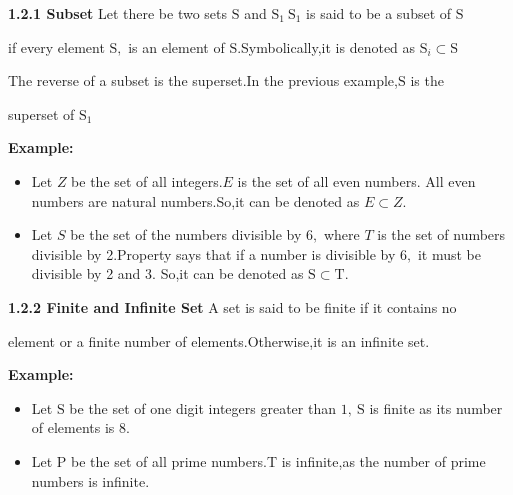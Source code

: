 \documentclass [10pt,a4paper]{book}
\begin{document}
\textbf{1.2.1 Subset}
Let there be two sets $\mathrm{S}$ and $\mathrm{S}_{1} \mathrm{~S}_{1}$ is said to be a subset of $\mathrm{S}$

if every element $\mathrm{S},$ is an element of $\mathrm{S}$.Symbolically,it is denoted as $\mathrm{S}_{i} \subset \mathrm{S}$

The reverse of a subset is the superset.In the previous example,$\mathrm{S}$ is the

superset of $\mathrm{S}_{1}$


\textbf{Example:}
\begin{itemize}
\item
Let $Z$ be the set of all integers.$E$ is the set of all even numbers. All even numbers are natural numbers.So,it can be denoted as $E \subset Z$.
\item
Let $S$ be the set of the numbers divisible by $6,$ where $T$ is the set of numbers divisible by 2.Property says that if a number is divisible by $6,$ it must be divisible by 2 and $3.$ So,it can be denoted as $\mathrm{S} \subset \mathrm{T}$.
\end{itemize}

\textbf{1.2.2 Finite and Infinite Set}
A set is said to be finite if it contains no

element or a finite number of elements.Otherwise,it is an infinite set.


\textbf{Example:}
\begin{itemize}
\item
Let $\mathrm{S}$ be the set of one digit integers greater than $1,\mathrm{~S}$ is finite as its number of elements is 8.
\item
Let P be the set of all prime numbers.T is infinite,as the number of prime numbers is infinite.
\end{itemize}
\end{document}
